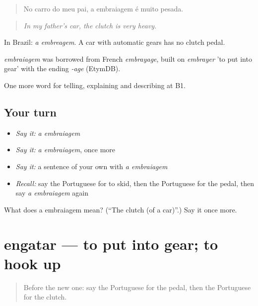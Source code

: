 \begin{quote}
No carro do meu pai, a embraiagem é muito pesada.
\end{quote}

\begin{quote}
\emph{In my father's car, the clutch is very heavy.}
\end{quote}

In Brazil: \emph{a embreagem}. A car with automatic gears has no clutch pedal.

\begin{cousinweb}
\emph{embraiagem} was borrowed from French \emph{embrayage}, built on \emph{embrayer} 'to put into gear' with the ending \emph{-age} (EtymDB).
\end{cousinweb}

\begin{grammarlens}[title={What you've built}]
One more word for telling, explaining and describing at B1.
\end{grammarlens}

\subsection*{Your turn}
\begin{itemize}
\raggedright
  \item \emph{Say it:} \emph{a embraiagem}
  \item \emph{Say it:} \emph{a embraiagem}, once more
  \item \emph{Say it:} a sentence of your own with \emph{a embraiagem}
  \item \emph{Recall:} say the Portuguese for to skid, then the Portuguese for the pedal, then say \emph{a embraiagem} again
\end{itemize}

\begin{tcolorbox}[breakable,colback=teal!4,colframe=teal!35!black,title={Before you move on}]
What does a embraiagem mean? (\textquotedblleft{}The clutch (of a car)\textquotedblright{}.) Say it once more.
\end{tcolorbox}
\section[engatar]{engatar — to put into gear; to hook up}

\label{lesson:PT-C402-engatar}



\begin{quote}
Before the new one: say the Portuguese for the pedal, then the Portuguese for the clutch.
\end{quote}

